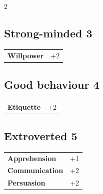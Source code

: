 \begin{multicols}{2}
\begin{tcolorbox}

\end{tcolorbox}

\begin{tcolorbox}
    \subsection*{Strong-minded \hfill \small{3 }}
    \tcblower




\begin{tabular}{@{}ll@{}}
    \textbf{Willpower} & +2\\
\end{tabular}


\end{tcolorbox}

\begin{tcolorbox}
    \subsection*{Good behaviour \hfill \small{4 }}
    \tcblower




\begin{tabular}{@{}ll@{}}
    \textbf{Etiquette} & +2\\
\end{tabular}


\end{tcolorbox}

\begin{tcolorbox}
    \subsection*{Extroverted \hfill \small{5 }}
    \tcblower




\begin{tabular}{@{}ll@{}}
    \textbf{Apprehension} & +1\\
    \textbf{Communication} & +2\\
    \textbf{Persuasion} & +2\\
\end{tabular}


\end{tcolorbox}
\end{multicols}

